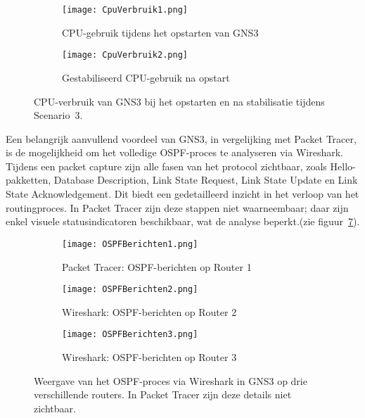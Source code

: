 \vspace{0.3cm}

\begin{figure}[H]
    \centering
    \begin{subfigure}[b]{0.48\textwidth}
        \texttt{[image: CpuVerbruik1.png]}
        \caption{CPU-gebruik tijdens het opstarten van GNS3}
        \label{fig:cpu_opstart}
    \end{subfigure}
    \hfill
    \begin{subfigure}[b]{0.48\textwidth}
        \texttt{[image: CpuVerbruik2.png]}
        \caption{Gestabiliseerd CPU-gebruik na opstart}
        \label{fig:cpu_na_opstart}
    \end{subfigure}
    \caption[CPU verbruik van GNS3 tijdens Scenario 3.]{\label{fig:cpu_gns3}CPU-verbruik van GNS3 bij het opstarten en na stabilisatie tijdens Scenario~3.}
\end{figure}


Een belangrijk aanvullend voordeel van GNS3, in vergelijking met Packet Tracer, is de mogelijkheid om het volledige OSPF-proces te analyseren via Wireshark. Tijdens een packet capture zijn alle fasen van het protocol zichtbaar, zoals Hello-pakketten, Database Description, Link State Request, Link State Update en Link State Acknowledgement. Dit biedt een gedetailleerd inzicht in het verloop van het routingproces. In Packet Tracer zijn deze stappen niet waarneembaar; daar zijn enkel visuele statusindicatoren beschikbaar, wat de analyse beperkt.(zie figuur~\ref{fig:ospf_wireshark}).

\begin{figure}[H]
    \centering
    
    \begin{subfigure}[b]{\textwidth}
        \centering
        \texttt{[image: OSPFBerichten1.png]}
        \caption{Packet Tracer: OSPF-berichten op Router 1}
        \label{fig:ospf_r1}
    \end{subfigure}
    
    \vspace{1em}
    
    \begin{subfigure}[b]{\textwidth}
        \centering
        \texttt{[image: OSPFBerichten2.png]}
        \caption{Wireshark: OSPF-berichten op Router 2}
        \label{fig:ospf_r2}
    \end{subfigure}
    
    \vspace{1em}
    
    \begin{subfigure}[b]{\textwidth}
        \centering
        \texttt{[image: OSPFBerichten3.png]}
        \caption{Wireshark: OSPF-berichten op Router 3}
        \label{fig:ospf_r3}
    \end{subfigure}
    
    \caption[OSPF verkeer zichtbaar via Wireshark in GNS3.]{\label{fig:ospf_wireshark}Weergave van het OSPF-proces via Wireshark in GNS3 op drie verschillende routers. In Packet Tracer zijn deze details niet zichtbaar.}
\end{figure}



